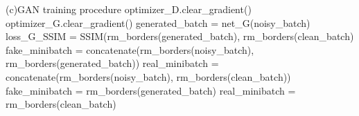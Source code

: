 \begin{algorithmic}
\STATE (c)GAN training procedure
\STATE optimizer\_D.clear\_gradient()
\STATE optimizer\_G.clear\_gradient()
\STATE generated\_batch = net\_G(noisy\_batch) 
\STATE loss\_G\_SSIM = SSIM(rm\_borders(generated\_batch), rm\_borders(clean\_batch)
\STATE fake\_minibatch = concatenate(rm\_borders(noisy\_batch), rm\_borders(generated\_batch))
\STATE real\_minibatch = concatenate(rm\_borders(noisy\_batch), rm\_borders(clean\_batch))
\ELSE
\STATE fake\_minibatch = rm\_borders(generated\_batch)
\STATE real\_minibatch = rm\_borders(clean\_batch)
\ENDIF
\ENDFOR
\end{algorithmic}
